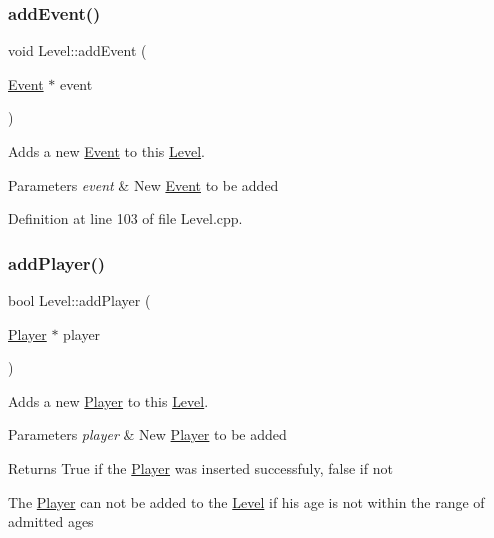 \hypertarget{class_level_a86b0d3ec7bb14fd7002c332b328dd96d}{}\label{class_level_a86b0d3ec7bb14fd7002c332b328dd96d} 
\subsubsection{\texorpdfstring{add\+Event()}{addEvent()}}
{\footnotesize\ttfamily void Level\+::add\+Event (\begin{DoxyParamCaption}\item[{\hyperlink{class_event}{Event} $\ast$}]{event }\end{DoxyParamCaption})}



Adds a new \hyperlink{class_event}{Event} to this \hyperlink{class_level}{Level}. 


\begin{DoxyParams}{Parameters}
{\em event} & New \hyperlink{class_event}{Event} to be added \\
\hline
\end{DoxyParams}


Definition at line 103 of file Level.\+cpp.

\hypertarget{class_level_a66290778fa4bcd2f29b9ff3e605b2902}{}\label{class_level_a66290778fa4bcd2f29b9ff3e605b2902} 
\subsubsection{\texorpdfstring{add\+Player()}{addPlayer()}}
{\footnotesize\ttfamily bool Level\+::add\+Player (\begin{DoxyParamCaption}\item[{\hyperlink{class_player}{Player} $\ast$}]{player }\end{DoxyParamCaption})\hspace{0.3cm}{\ttfamily [virtual]}}



Adds a new \hyperlink{class_player}{Player} to this \hyperlink{class_level}{Level}. 


\begin{DoxyParams}{Parameters}
{\em player} & New \hyperlink{class_player}{Player} to be added \\
\hline
\end{DoxyParams}
\begin{DoxyReturn}{Returns}
True if the \hyperlink{class_player}{Player} was inserted successfuly, false if not
\end{DoxyReturn}
The \hyperlink{class_player}{Player} can not be added to the \hyperlink{class_level}{Level} if his age is not within the range of admitted ages 


